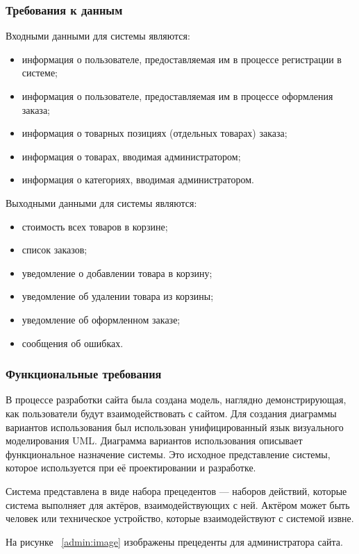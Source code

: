 \subsubsection{Требования к данным}
Входными данными для системы являются:
\begin{itemize}
	\item информация о пользователе, предоставляемая им в процессе регистрации в системе;
	\item информация о пользователе, предоставляемая им в процессе оформления заказа;
	\item информация о товарных позициях (отдельных товарах) заказа;
	\item информация о товарах, вводимая администратором;
	\item информация о категориях, вводимая администратором.
\end{itemize}

Выходными данными для системы являются:
\begin{itemize}
	\item стоимость всех товаров в корзине;
	\item список заказов;
	\item уведомление о добавлении товара в корзину;
	\item уведомление об удалении товара из корзины;
	\item уведомление об оформленном заказе;
	\item сообщения об ошибках.
\end{itemize}


\subsubsection{Функциональные требования}

В процессе разработки сайта была создана модель, наглядно демонстрирующая, как пользователи будут взаимодействовать с сайтом. Для создания диаграммы вариантов использования был использован унифицированный язык визуального моделирования UML. Диаграмма вариантов использования описывает функциональное назначение системы. Это исходное представление системы, которое используется при её проектировании и разработке.

Система представлена в виде набора прецедентов — наборов действий, которые система выполняет для актёров, взаимодействующих с ней. Актёром может быть человек или техническое устройство, которые взаимодействуют с системой извне. 

На рисунке ~\ref{admin:image} изображены прецеденты для администратора сайта.

